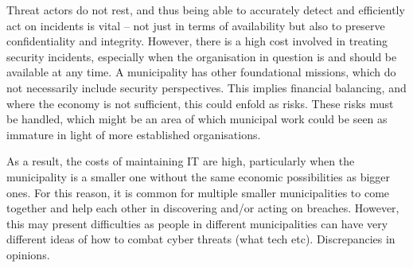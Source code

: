 \documentclass{article}
\begin{document}
\begin{enumerate}
    Threat actors do not rest, %
    and thus being able to accurately detect and efficiently act on incidents is vital -- not just in terms of availability but also to preserve confidentiality and integrity.
    However, there is a high cost involved in treating security incidents, especially when the organisation in question is and should be available at any time.
    A municipality has other foundational missions, which do not necessarily include security perspectives.
    This implies financial balancing, and where the economy is not sufficient, this could enfold as risks.
    These risks must be handled, which might be an area of which municipal work could be seen as immature in light of more established organisations.
    
    As a result, the costs of maintaining IT are high, particularly when the municipality is a smaller one without the same economic possibilities as bigger ones.
    For this reason, it is common for multiple smaller municipalities to come together and help each other in discovering and/or acting on breaches.
    However, this may present difficulties as people in different municipalities can have very different ideas of how to combat cyber threats (what tech etc). Discrepancies in opinions.
    

\end{enumerate}
\end{document}
